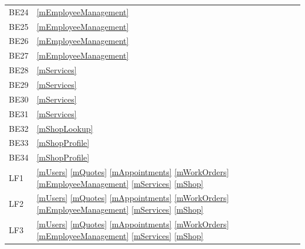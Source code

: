 \documentclass[12pt, titlepage]{article}
\begin{document}
\begin{longtable}{p{} p{}}
	BE24                  & \ref{mEmployeeManagement}                                                                                              \\
	BE25                  & \ref{mEmployeeManagement}                                                                                              \\
	BE26                  & \ref{mEmployeeManagement}                                                                                              \\
	BE27                  & \ref{mEmployeeManagement}                                                                                              \\
	BE28                  & \ref{mServices}                                                                                                        \\
	BE29                  & \ref{mServices}                                                                                                        \\
	BE30                  & \ref{mServices}                                                                                                        \\
	BE31                  & \ref{mServices}                                                                                                        \\
	BE32                  & \ref{mShopLookup}                                                                                                      \\
	BE33                  & \ref{mShopProfile}                                                                                                     \\
	BE34                  & \ref{mShopProfile}                                                                                                     \\
	LF1                   & \ref{mUsers} \ref{mQuotes} \ref{mAppointments} \ref{mWorkOrders} \ref{mEmployeeManagement} \ref{mServices} \ref{mShop} \\
	LF2                   & \ref{mUsers} \ref{mQuotes} \ref{mAppointments} \ref{mWorkOrders} \ref{mEmployeeManagement} \ref{mServices} \ref{mShop} \\
	LF3                   & \ref{mUsers} \ref{mQuotes} \ref{mAppointments} \ref{mWorkOrders} \ref{mEmployeeManagement} \ref{mServices} \ref{mShop} \\

\end{longtable}
\end{document}
